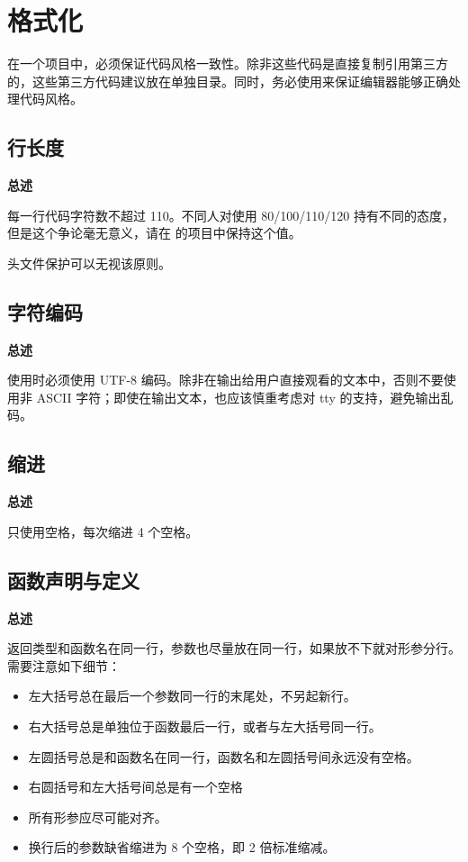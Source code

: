\chapter{格式化}

在一个项目中，必须保证代码风格一致性。除非这些代码是直接复制引用第三方的，这些第三方代码建议放在单独目录。同时，务必使用来保证编辑器能够正确处理代码风格。

\section{行长度}

\textbf{总述}

每一行代码字符数不超过 110。不同人对使用 80/100/110/120 持有不同的态度，但是这个争论毫无意义，请在 \deepin 的项目中保持这个值。

\begin{DNote}
头文件保护可以无视该原则。
\end{DNote}

\section{字符编码}

\textbf{总述}

使用时必须使用 UTF-8 编码。除非在输出给用户直接观看的文本中，否则不要使用非 ASCII 字符；即使在输出文本，也应该慎重考虑对 tty 的支持，避免输出乱码。

\section{缩进}

\textbf{总述}

只使用空格，每次缩进 4 个空格。

\section{函数声明与定义}

\textbf{总述}

返回类型和函数名在同一行，参数也尽量放在同一行，如果放不下就对形参分行。需要注意如下细节：

\begin{itemize}
  \item 左大括号总在最后一个参数同一行的末尾处，不另起新行。
  \item 右大括号总是单独位于函数最后一行，或者与左大括号同一行。
  \item 左圆括号总是和函数名在同一行，函数名和左圆括号间永远没有空格。
  \item 右圆括号和左大括号间总是有一个空格
  \item 所有形参应尽可能对齐。
  \item 换行后的参数缺省缩进为 8 个空格，即 2 倍标准缩减。
\end{itemize}

